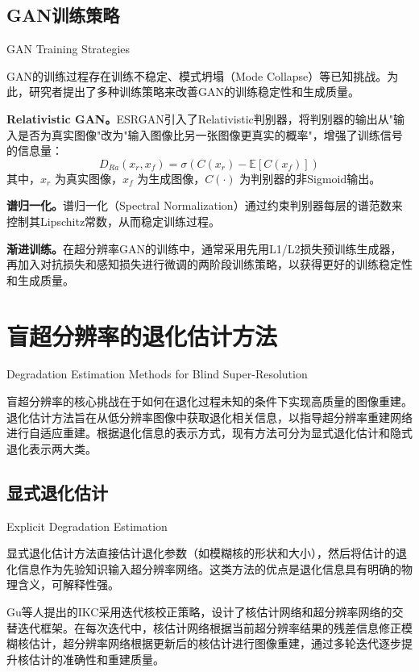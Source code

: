 \subsection{GAN训练策略}{GAN Training Strategies}

GAN的训练过程存在训练不稳定、模式坍塌（Mode Collapse）等已知挑战。为此，研究者提出了多种训练策略来改善GAN的训练稳定性和生成质量。

\textbf{Relativistic GAN。}ESRGAN\cite{wang2018esrgan}引入了Relativistic判别器，将判别器的输出从"输入是否为真实图像"改为"输入图像比另一张图像更真实的概率"，增强了训练信号的信息量：
\begin{equation}
  D_{Ra}(x_r, x_f) = \sigma(C(x_r) - \mathbb{E}[C(x_f)])
  \label{eq:relativistic_discriminator}
\end{equation}
其中，$x_r$ 为真实图像，$x_f$ 为生成图像，$C(\cdot)$ 为判别器的非Sigmoid输出。

\textbf{谱归一化。}谱归一化（Spectral Normalization）通过约束判别器每层的谱范数来控制其Lipschitz常数，从而稳定训练过程。

\textbf{渐进训练。}在超分辨率GAN的训练中，通常采用先用L1/L2损失预训练生成器，再加入对抗损失和感知损失进行微调的两阶段训练策略，以获得更好的训练稳定性和生成质量。

\section{盲超分辨率的退化估计方法}{Degradation Estimation Methods for Blind Super-Resolution}

盲超分辨率的核心挑战在于如何在退化过程未知的条件下实现高质量的图像重建。退化估计方法旨在从低分辨率图像中获取退化相关信息，以指导超分辨率重建网络进行自适应重建。根据退化信息的表示方式，现有方法可分为显式退化估计和隐式退化表示两大类。

\subsection{显式退化估计}{Explicit Degradation Estimation}

显式退化估计方法直接估计退化参数（如模糊核的形状和大小），然后将估计的退化信息作为先验知识输入超分辨率网络。这类方法的优点是退化信息具有明确的物理含义，可解释性强。

Gu等人提出的IKC\cite{gu2019blind}采用迭代核校正策略，设计了核估计网络和超分辨率网络的交替迭代框架。在每次迭代中，核估计网络根据当前超分辨率结果的残差信息修正模糊核估计，超分辨率网络根据更新后的核估计进行图像重建，通过多轮迭代逐步提升核估计的准确性和重建质量。

